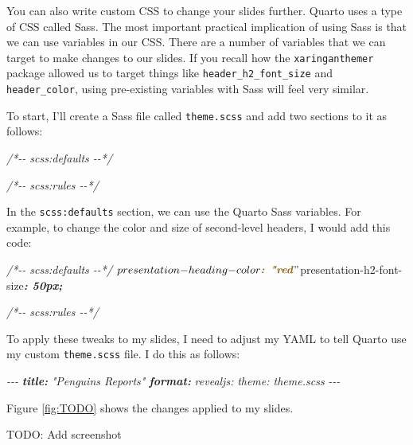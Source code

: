 \documentclass[
]{book}
\newenvironment{Shaded}{\begin{snugshade}}{\end{snugshade}}
\newcommand{\AnnotationTok}[1]{\textcolor[rgb]{0.56,0.35,0.01}{\textbf{\textit{#1}}}}
\newcommand{\CommentTok}[1]{\textcolor[rgb]{0.56,0.35,0.01}{\textit{#1}}}
\newcommand{\InformationTok}[1]{\textcolor[rgb]{0.56,0.35,0.01}{\textbf{\textit{#1}}}}
\newcommand{\NormalTok}[1]{#1}
\begin{document}
You can also write custom CSS to change your slides further. Quarto uses a type of CSS called Sass. The most important practical implication of using Sass is that we can use variables in our CSS. There are a number of variables that we can target to make changes to our slides. If you recall how the \texttt{xaringanthemer} package allowed us to target things like \texttt{header\_h2\_font\_size} and \texttt{header\_color}, using pre-existing variables with Sass will feel very similar.

To start, I'll create a Sass file called \texttt{theme.scss} and add two sections to it as follows:

\begin{Shaded}
\begin{Highlighting}[]
\CommentTok{/*{-}{-} scss:defaults {-}{-}*/}

\CommentTok{/*{-}{-} scss:rules {-}{-}*/}
\end{Highlighting}
\end{Shaded}

In the \texttt{scss:defaults} section, we can use the Quarto Sass variables. For example, to change the color and size of second-level headers, I would add this code:

\begin{Shaded}
\begin{Highlighting}[]
\CommentTok{/*{-}{-} scss:defaults {-}{-}*/}
\NormalTok{$presentation{-}heading{-}color}\InformationTok{: "red}\NormalTok{"}
\NormalTok{$presentation{-}h2{-}font{-}size}\InformationTok{: 50px;}

\CommentTok{/*{-}{-} scss:rules {-}{-}*/}
\end{Highlighting}
\end{Shaded}

To apply these tweaks to my slides, I need to adjust my YAML to tell Quarto use my custom \texttt{theme.scss} file. I do this as follows:

\begin{Shaded}
\begin{Highlighting}[]
\CommentTok{{-}{-}{-}}
\AnnotationTok{title:}\CommentTok{ "Penguins Reports"}
\AnnotationTok{format:}
\CommentTok{  revealjs: }
\CommentTok{    theme: theme.scss}
\CommentTok{{-}{-}{-}}
\end{Highlighting}
\end{Shaded}

Figure \ref{fig:TODO} shows the changes applied to my slides.

TODO: Add screenshot
\end{document}
